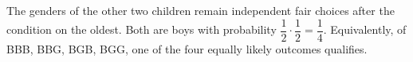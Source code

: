 The genders of the other two children remain independent fair choices after the condition on the oldest. Both are boys with probability $\dfrac{1}{2}\cdot\dfrac{1}{2}=\boxed{\dfrac{1}{4}}$. Equivalently, of BBB, BBG, BGB, BGG, one of the four equally likely outcomes qualifies.
